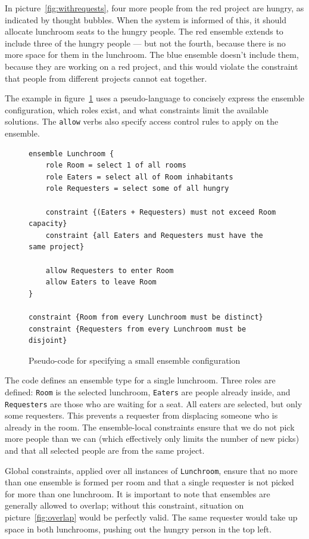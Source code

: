 In picture~\ref{fig:withrequests}, four more people from the red project are hungry, as
indicated by thought bubbles. When the system is informed of this, it should allocate
lunchroom seats to the hungry people. The red ensemble extends to include three of the
hungry people --- but not the fourth, because there is no more space for them in the
lunchroom. The blue ensemble doesn't include them, because they are working on a red
project, and this would violate the constraint that people from different projects
cannot eat together.

\medskip

The example in figure~\ref{lst:pseudo} uses a pseudo-language to concisely express the
ensemble configuration, which roles exist, and what constraints limit the available
solutions. The \lstinline{allow} verbs also specify access control rules to apply on the
ensemble.

\begin{figure}[b]
    \begin{lstlisting}[style=pseudo]
ensemble Lunchroom {
    role Room = select 1 of all rooms
    role Eaters = select all of Room inhabitants
    role Requesters = select some of all hungry

    constraint {(Eaters + Requesters) must not exceed Room capacity}
    constraint {all Eaters and Requesters must have the same project}

    allow Requesters to enter Room
    allow Eaters to leave Room
}

constraint {Room from every Lunchroom must be distinct}
constraint {Requesters from every Lunchroom must be disjoint}
\end{lstlisting}
    \caption{Pseudo-code for specifying a small ensemble configuration}
    \label{lst:pseudo}
\end{figure}

The code defines an ensemble type for a single lunchroom. Three roles are defined:
\lstinline{Room} is the selected lunchroom, \lstinline{Eaters} are people already
inside, and \lstinline{Requesters} are those who are waiting for a seat. All eaters are
selected, but only some requesters. This prevents a requester from displacing someone
who is already in the room. The ensemble-local constraints ensure that we do not pick
more people than we can (which effectively only limits the number of new picks) and that
all selected people are from the same project.

Global constraints, applied over all instances of \lstinline{Lunchroom}, ensure that no
more than one ensemble is formed per room and that a single requester is not picked for
more than one lunchroom. It is important to note that ensembles are generally allowed to
overlap; without this constraint, situation on picture~\ref{fig:overlap} would be
perfectly valid. The same requester would take up space in both lunchrooms, pushing out
the hungry person in the top left.

